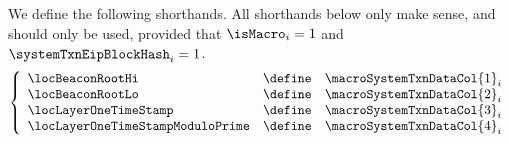 We define the following shorthands.
All shorthands below only make sense, and should only be used, provided that
$\isMacro               _{i} = 1$ and
$\systemTxnEipBlockHash _{i} = 1$.
\[
	\left\{ \begin{array}{lcl}
		\locBeaconRootHi                  & \define & \macroSystemTxnDataCol {1} _{i} \\
		\locBeaconRootLo                  & \define & \macroSystemTxnDataCol {2} _{i} \\
		\locLayerOneTimeStamp             & \define & \macroSystemTxnDataCol {3} _{i} \\
		\locLayerOneTimeStampModuloPrime  & \define & \macroSystemTxnDataCol {4} _{i} \\
	\end{array} \right.
\]
